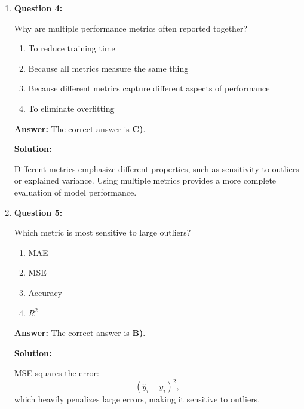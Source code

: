 \documentclass{article}
\begin{document}
\begin{enumerate}
\textbf{Answer:} The correct answer is \textbf{C)}.

\textbf{Solution:}

\[
R^2 = 1 - \frac{SS_{res}}{SS_{tot}}.
\]
If $R^2 < 0$, the model performs worse than predicting the mean of the target variable.

\vspace{6pt}

\item \textbf{Question 4:}

Why are multiple performance metrics often reported together?

\begin{enumerate}
    \item To reduce training time
    \item Because all metrics measure the same thing
    \item Because different metrics capture different aspects of performance
    \item To eliminate overfitting
\end{enumerate}

\textbf{Answer:} The correct answer is \textbf{C)}.

\textbf{Solution:}

Different metrics emphasize different properties, such as sensitivity to outliers or explained variance.  
Using multiple metrics provides a more complete evaluation of model performance.

\vspace{6pt}

\item \textbf{Question 5:}

Which metric is most sensitive to large outliers?

\begin{enumerate}
    \item MAE
    \item MSE
    \item Accuracy
    \item $R^2$
\end{enumerate}

\textbf{Answer:} The correct answer is \textbf{B)}.

\textbf{Solution:}

MSE squares the error:
\[
(\hat{y}_i - y_i)^2,
\]
which heavily penalizes large errors, making it sensitive to outliers.

\vspace{6pt}


\end{enumerate}
\end{document}
